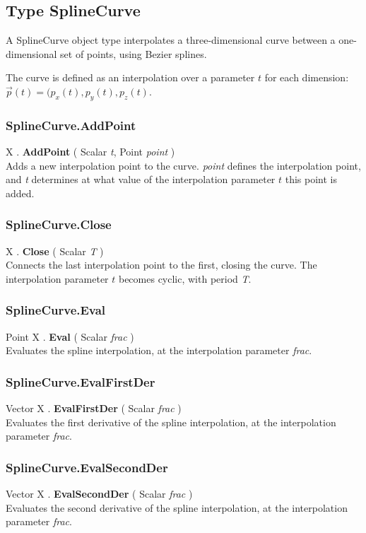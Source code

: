 \documentclass[10pt]{book}
\newcommand{\var}[1]{\textit{#1}}
\begin{document}
\subsection{Type SplineCurve \label{T:SplineCurve}}
A SplineCurve object type interpolates a three-dimensional curve between a one-dimensional set of points, using Bezier splines.

The curve is defined as an interpolation over a parameter $t$ for each dimension: $\vec{p}(t)=(p_x(t),p_y(t),p_z(t)$.


\subsubsection{SplineCurve.AddPoint \label{F:SplineCurve:AddPoint}}
X . \textbf{AddPoint} ( Scalar \textit{t}, Point \textit{point} ) \\
Adds a new interpolation point to the curve. \var{point} defines the interpolation point, and \var{t} determines at what value of the interpolation parameter $t$ this point is added.

\subsubsection{SplineCurve.Close \label{F:SplineCurve:Close}}
X . \textbf{Close} ( Scalar \textit{T} ) \\
Connects the last interpolation point to the first, closing the curve. The interpolation parameter $t$ becomes cyclic, with period \var{T}.

\subsubsection{SplineCurve.Eval \label{F:SplineCurve:Eval}}
Point X . \textbf{Eval} ( Scalar \textit{frac} ) \\
Evaluates the spline interpolation, at the interpolation parameter \var{frac}.

\subsubsection{SplineCurve.EvalFirstDer \label{F:SplineCurve:EvalFirstDer}}
Vector X . \textbf{EvalFirstDer} ( Scalar \textit{frac} ) \\
Evaluates the first derivative of the spline interpolation, at the interpolation parameter \var{frac}.


\subsubsection{SplineCurve.EvalSecondDer \label{F:SplineCurve:EvalSecondDer}}
Vector X . \textbf{EvalSecondDer} ( Scalar \textit{frac} ) \\
Evaluates the second derivative of the spline interpolation, at the interpolation parameter \var{frac}.
\end{document}
